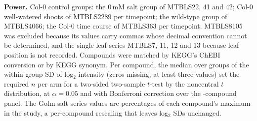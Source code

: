 \documentclass{npjlayout}
\begin{document}
\textbf{Power.} Col-0 control groups: the 0\,mM salt group of MTBLS22, 41 and 42; Col-0
well-watered shoots of MTBLS2289 per timepoint; the wild-type group of MTBLS4066; the Col-0 time
course of MTBLS363 per timepoint. MTBLS8105 was excluded because its values carry commas whose
decimal convention cannot be determined, and the single-leaf series MTBLS7, 11, 12 and 13 because
leaf position is not recorded. Compounds were matched by KEGG's ChEBI conversion or by KEGG
synonym. Per compound, the median over groups of the within-group SD of log$_2$ intensity (zeros
missing, at least three values) set the required $n$ per arm for a two-sided two-sample $t$-test by
the noncentral $t$ distribution, at $\alpha = 0.05$ and with Bonferroni correction over the
\nPanel-compound panel. The Golm salt-series values are percentages of each compound's maximum in the
study, a per-compound rescaling that leaves log$_2$ SDs unchanged.
\end{document}
